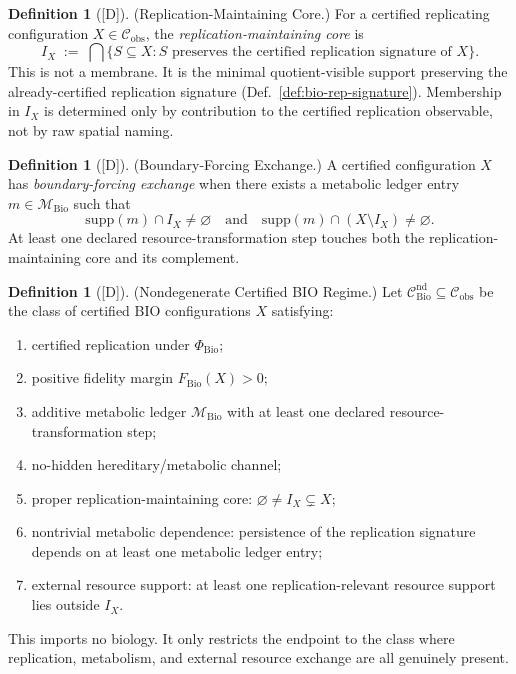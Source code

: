 \documentclass[12pt,oneside]{amsbook}
\theoremstyle{plain}
\theoremstyle{definition}
\newtheorem{definition}[theorem]{Definition}
\theoremstyle{remark}
\newcommand{\status}[1]{\textup{[#1]}}
\begin{document}
\begin{definition}[\status{D}]\label{def:bio-rep-maintaining-core}
\textup{(Replication-Maintaining Core.)}
For a certified replicating configuration $X \in \mathcal{C}_{\mathrm{obs}}$,
the \emph{replication-maintaining core} is
\[
 I_X \;:=\; \bigcap\bigl\{S \subseteq X :
 S \text{ preserves the certified replication signature of } X\bigr\}.
\]
This is not a membrane. It is the minimal quotient-visible support
preserving the already-certified replication signature
(Def.~\ref{def:bio-rep-signature}). Membership in $I_X$ is determined
only by contribution to the certified replication observable, not by
raw spatial naming.
\end{definition}

\begin{definition}[\status{D}]\label{def:bio-boundary-forcing-exchange}
\textup{(Boundary-Forcing Exchange.)}
A certified configuration $X$ has \emph{boundary-forcing exchange}
when there exists a metabolic ledger entry $m \in \mathcal{M}_{\mathrm{Bio}}$
such that
\[
 \mathrm{supp}(m) \cap I_X \neq \varnothing
 \quad\text{and}\quad
 \mathrm{supp}(m) \cap (X \setminus I_X) \neq \varnothing.
\]
At least one declared resource-transformation step touches both the
replication-maintaining core and its complement.
\end{definition}

\begin{definition}[\status{D}]\label{def:bio-nondegenerate-regime}
\textup{(Nondegenerate Certified BIO Regime.)}
Let $\mathcal{C}_{\mathrm{Bio}}^{\mathrm{nd}} \subseteq \mathcal{C}_{\mathrm{obs}}$
be the class of certified BIO configurations $X$ satisfying:
\begin{enumerate}[label=\textup{(\arabic*)}]
 \item certified replication under $\Phi_{\mathrm{Bio}}$;
 \item positive fidelity margin $F_{\mathrm{Bio}}(X) > 0$;
 \item additive metabolic ledger $\mathcal{M}_{\mathrm{Bio}}$
 with at least one declared resource-transformation step;
 \item no-hidden hereditary/metabolic channel;
 \item proper replication-maintaining core:
 $\varnothing \neq I_X \subsetneq X$;
 \item nontrivial metabolic dependence: persistence of the
 replication signature depends on at least one metabolic
 ledger entry;
 \item external resource support: at least one replication-relevant
 resource support lies outside $I_X$.
\end{enumerate}
This imports no biology. It only restricts the endpoint to the class
where replication, metabolism, and external resource exchange are all
genuinely present.
\end{definition}
\end{document}
